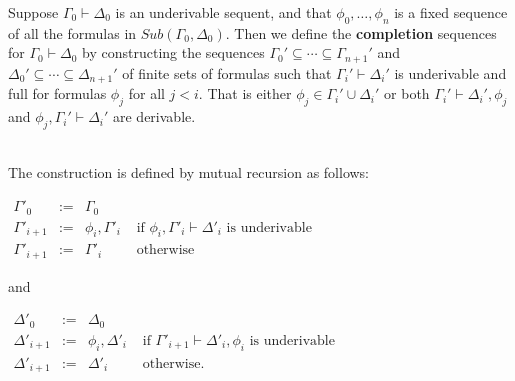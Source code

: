 \documentclass{article}
\begin{document}
\begin{definition}
  \label{def:completion_sequence}
  Suppose $\Gamma_0 \vdash \Delta_0$ is an underivable sequent, and that
  $\phi_0, \ldots, \phi_n$ is a fixed sequence of all the formulas in $Sub(\Gamma_0,\Delta_0)$.  
  Then we define the \textbf{completion} sequences for $\Gamma_0 \vdash \Delta_0$ by constructing the sequences
  $\Gamma_0' \subseteq \cdots \subseteq \Gamma_{n+1}'$  and $\Delta_0' \subseteq \cdots \subseteq \Delta_{n+1}'$
  of finite sets of formulas such that $\Gamma_i' \vdash \Delta_i'$ is underivable and full for 
  formulas $\phi_j$ for all $j < i$.  That is either $\phi_j \in \Gamma_i' \cup \Delta_i'$ or both
  $\Gamma_i' \vdash \Delta_i',\phi_j$ and $\phi_j,\Gamma_i' \vdash \Delta_i'$ are derivable.

  \ \\
  The construction is defined by mutual recursion as follows:
  \begin{center}
    \begin{math}
      \begin{array}{llll}
        \Gamma'_0         & := & \Gamma_0 \\
        \Gamma'_{i+1}     & := & \phi_i,\Gamma'_i & \text{ if } \phi_i, \Gamma'_i \vdash \Delta'_i 
                                                    \text{ is underivable }\\
        \Gamma'_{i+1}     & := & \Gamma'_i & \text{ otherwise }
      \end{array}
    \end{math}
  \end{center}
  \noindent
  and \ \\
  \begin{center}
    \begin{math}
      \begin{array}{llll}
        \Delta'_0         & := & \Delta_0 \\
        \Delta'_{i+1}     & := & \phi_i,\Delta'_i & \text{ if } \Gamma'_{i+1} \vdash \Delta'_i,\phi_i
                                                    \text{ is underivable }\\
        \Delta'_{i+1}     & := & \Delta'_i & \text{ otherwise. }
      \end{array}
    \end{math}
  \end{center}
\end{definition}
\end{document}
